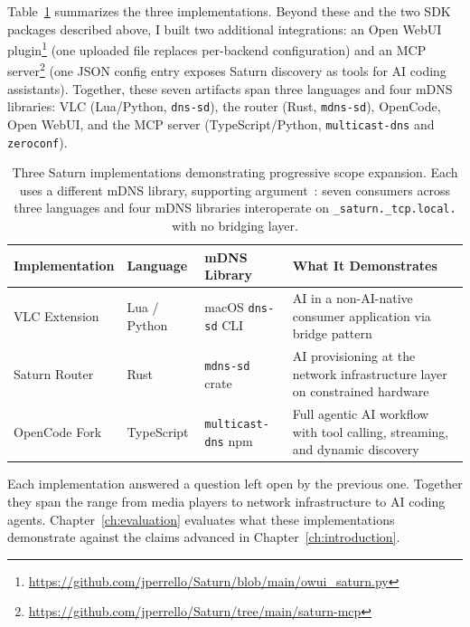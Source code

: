 Table~\ref{tab:impl-summary} summarizes the three implementations. Beyond these and the two SDK packages described above, I built two additional integrations: an Open WebUI plugin\footnote{\url{https://github.com/jperrello/Saturn/blob/main/owui_saturn.py}} (one uploaded file replaces per-backend configuration) and an MCP server\footnote{\url{https://github.com/jperrello/Saturn/tree/main/saturn-mcp}} (one JSON config entry exposes Saturn discovery as tools for AI coding assistants). Together, these seven artifacts span three languages and four mDNS libraries: VLC (Lua/Python, \texttt{dns-sd}), the router (Rust, \texttt{mdns-sd}), OpenCode, Open WebUI, and the MCP server (TypeScript/Python, \texttt{multicast-dns} and \texttt{zeroconf}).

\begin{table}[ht]
\centering
\small
\begin{tabular}{p{2.8cm} p{2.0cm} p{2.2cm} p{5.5cm}}
\hline
\textbf{Implementation} & \textbf{Language} & \textbf{mDNS Library} & \textbf{What It Demonstrates} \\
\hline
VLC Extension & Lua / Python & macOS \texttt{dns-sd} CLI & AI in a non-AI-native consumer application via bridge pattern \\
Saturn Router & Rust & \texttt{mdns-sd} crate & AI provisioning at the network infrastructure layer on constrained hardware \\
OpenCode Fork & TypeScript & \texttt{multicast-\allowbreak{}dns} npm & Full agentic AI workflow with tool calling, streaming, and dynamic discovery \\
\hline
\end{tabular}
\caption{Three Saturn implementations demonstrating progressive scope expansion. Each uses a different mDNS library, supporting argument~: seven consumers across three languages and four mDNS libraries interoperate on \texttt{\_saturn.\_tcp.local.} with no bridging layer.}
\label{tab:impl-summary}
\end{table}

Each implementation answered a question left open by the previous one. Together they span the range from media players to network infrastructure to AI coding agents. Chapter~\ref{ch:evaluation} evaluates what these implementations demonstrate against the claims advanced in Chapter~\ref{ch:introduction}.
